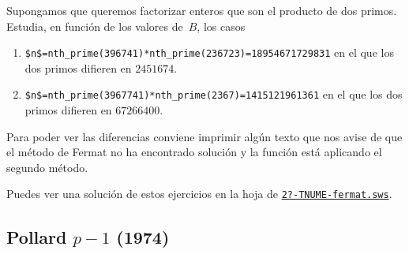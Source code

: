 \begin{ejer}
\begin{enumerate}
  Supongamos que queremos factorizar enteros que son el producto de dos primos.
{\sc Estudia}, en funci\'on de los valores de~$B$, los casos
  \begin{enumerate}
   \item \lstinline|$n$=nth_prime(396741)*nth_prime(236723)=18954671729831| en 
el
que los dos primos difieren en $2451674$.
   \item \lstinline|$n$=nth_prime(3967741)*nth_prime(2367)=1415121961361| en el
que los dos primos difieren en $67266400$.
  \end{enumerate}
Para poder ver las diferencias conviene imprimir alg\'un texto que nos avise de
que el m\'etodo de Fermat no ha encontrado soluci\'on  y la funci\'on est\'a
aplicando el segundo m\'etodo.
 \end{enumerate}
 
 \end{ejer}
Puedes ver una soluci\'on de estos ejercicios en la hoja de {\sage}
\href{http://sage.mat.uam.es:8888/home/pub/?/}{\tt 2?-TNUME-fermat.sws}.
  
  




\subsection{Pollard $p-1$ (1974)}							
				

